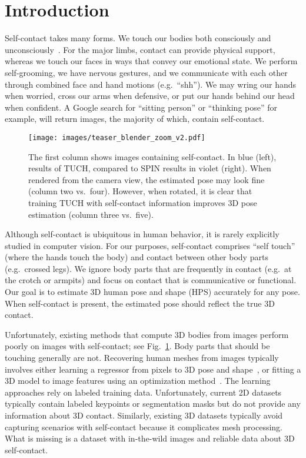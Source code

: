 \documentclass[final]{cvpr}
\theoremstyle{definition}
\begin{document}
\section{Introduction}

Self-contact takes many forms.  We touch our bodies both consciously and unconsciously~\cite{Kwok:2015}. For the major limbs, contact can provide physical support, whereas we touch our faces in ways that convey our emotional state. We perform self-grooming, we have nervous gestures, and we communicate with each other through combined face and hand motions (e.g.~``shh''). We may wring our hands when worried, cross our arms when defensive, or put our hands behind our head when confident.  
A Google search for ``sitting person'' or ``thinking pose'' for example, will return images, the majority of which, contain self-contact.

\begin{figure}
	\centerline{\texttt{[image: images/teaser\_blender\_zoom\_v2.pdf]}}
	\caption{The first column shows images containing self-contact. In blue (left), results of TUCH, compared to  SPIN results in violet (right). 
	When rendered from the camera view, the estimated pose may look fine (column two vs.~four). 
	However, when rotated, it is clear that training TUCH with self-contact information improves 3D pose estimation (column three vs.~five).}
	\label{fig:rotateview}
\end{figure}

Although self-contact is ubiquitous in human behavior, it is rarely explicitly studied in computer vision. 
For our purposes, self-contact comprises ``self touch'' (where the hands touch the body) and contact between other body parts (e.g.~crossed legs). 
We ignore body parts that are frequently in contact (e.g.~at the crotch or armpits) and focus on contact that is communicative or functional. 
Our goal is to estimate 3D human pose and shape (HPS) accurately for 
any pose.
When self-contact is present, the estimated pose should reflect the true 3D contact.

Unfortunately, existing methods that compute 3D bodies from images perform poorly on images with self-contact; see Fig.~\ref{fig:rotateview}.
Body parts that should be touching generally are not.
Recovering human meshes from images typically involves either learning a regressor from pixels to 3D pose and shape~\cite{kanazawa2018end,kolotouros2019learning}, or fitting a 3D model to image features using an optimization method~\cite{Bogo:ECCV:2016,SMPL-X:2019,xiang2019monocular,xiang2020monoclothcap}. 
The learning approaches rely on labeled training data.
Unfortunately, current 2D datasets typically contain labeled keypoints or segmentation masks but do not provide any information about 3D contact.
Similarly,  existing 3D datasets typically avoid capturing scenarios with self-contact because it complicates mesh processing.
What is missing is a dataset with in-the-wild images and reliable data about 3D self-contact.
\end{document}
